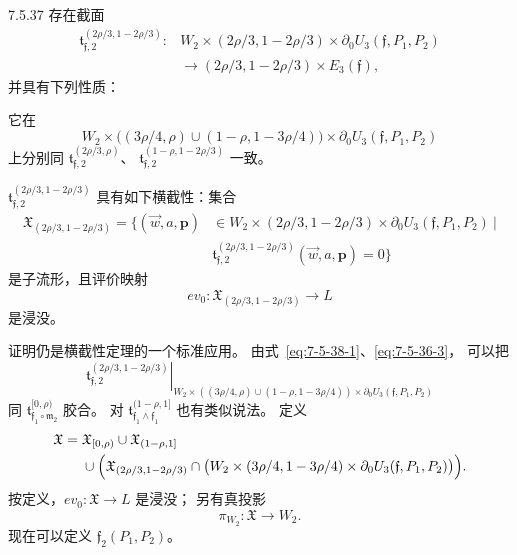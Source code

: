 \begin{lemma}{7.5.37}\label{lem:7-5-37}
存在截面
\[
\begin{aligned}
\mathfrak t_{\mathfrak f,2}^{(2\rho/3,1-2\rho/3)}\colon
&W_2\times(2\rho/3,1-2\rho/3)
\times\partial_0U_3(\mathfrak f,P_1,P_2)\\
&\longrightarrow
(2\rho/3,1-2\rho/3)\times E_3(\mathfrak f),
\end{aligned}
\]
并具有下列性质：

\textup{它在}
\begin{equation}
W_2\times
\bigl((3\rho/4,\rho)\cup(1-\rho,1-3\rho/4)\bigr)
\times\partial_0U_3(\mathfrak f,P_1,P_2)
\tag{7.5.38.1}\label{eq:7-5-38-1}
\end{equation}
\textup{上分别同}
$\mathfrak t_{\mathfrak f,2}^{(2\rho/3,\rho)}$、
$\mathfrak t_{\mathfrak f,2}^{(1-\rho,1-2\rho/3)}$
\textup{一致。}

$\mathfrak t_{\mathfrak f,2}^{(2\rho/3,1-2\rho/3)}$
\textup{具有如下横截性：集合}
\begin{equation}
\begin{aligned}
\mathfrak X_{(2\rho/3,1-2\rho/3)}
=\bigl\{(\vec w,a,\mathbf p)&\in
W_2\times(2\rho/3,1-2\rho/3)
\times\partial_0U_3(\mathfrak f,P_1,P_2)\ \big|\\
&\mathfrak t_{\mathfrak f,2}^{(2\rho/3,1-2\rho/3)}
(\vec w,a,\mathbf p)=0\bigr\}
\end{aligned}
\tag{7.5.38.2}\label{eq:7-5-38-2}
\end{equation}
\textup{是子流形，且评价映射}
\[
ev_0\colon\mathfrak X_{(2\rho/3,1-2\rho/3)}\longrightarrow L
\]
\textup{是浸没。}
\end{lemma}

证明仍是横截性定理的一个标准应用。
由式~\eqref{eq:7-5-38-1}、\eqref{eq:7-5-36-3}，
可以把
\[
\left.
\mathfrak t_{\mathfrak f,2}^{(2\rho/3,1-2\rho/3)}
\right|_{
W_2\times((3\rho/4,\rho)\cup(1-\rho,1-3\rho/4))
\times\partial_0U_3(\mathfrak f,P_1,P_2)}
\]
同
$\mathfrak t_{\mathfrak f_1\circ\mathfrak m_2}^{[0,\rho)}$
胶合。
对
$\mathfrak t_{\mathfrak f_1\wedge\mathfrak f_1}^{(1-\rho,1]}$
也有类似说法。
定义
\[
\begin{aligned}
\mathfrak X
={}&\mathfrak X_{[0,\rho)}\cup\mathfrak X_{(1-\rho,1]}\\
&\cup\Bigl(
\mathfrak X_{(2\rho/3,1-2\rho/3)}
\cap\bigl(
W_2\times(3\rho/4,1-3\rho/4)
\times\partial_0U_3(\mathfrak f,P_1,P_2)
\bigr)\Bigr).
\end{aligned}
\]
按定义，$ev_0\colon\mathfrak X\to L$ 是浸没；
另有真投影
\[
\pi_{W_2}\colon\mathfrak X\longrightarrow W_2.
\]
现在可以定义 $\mathfrak f_2(P_1,P_2)$。

